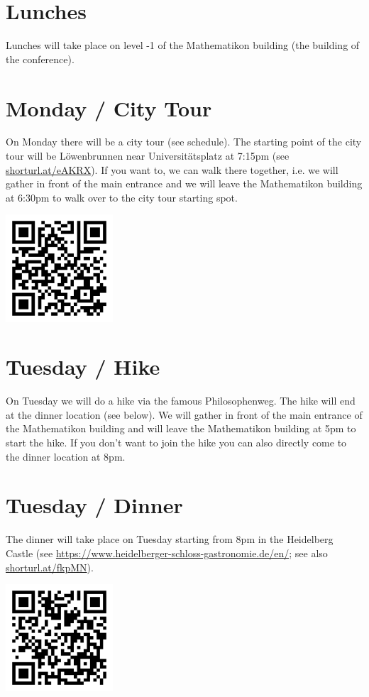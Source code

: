 \documentclass{article}
\begin{document}
\section{Lunches}
Lunches will take place on level -1 of the Mathematikon building (the building of the conference). 

\section{Monday / City Tour}
On Monday there will be a city tour (see schedule). The starting point of the city tour will be Löwenbrunnen near Universitätsplatz at 7:15pm (see \url{shorturl.at/eAKRX}). If you want to, we can walk there together, i.e. we will gather in front of the main entrance and we will leave the Mathematikon building at 6:30pm to walk over to the city tour starting spot. 
\begin{center}
        \includegraphics[width=4cm]{qr-code_citytour.png}
\end{center}
\vfill\pagebreak
\section{Tuesday / Hike}

On Tuesday we will do a hike via the famous Philosophenweg. The hike will end at the dinner location (see below). We will gather in front of the main entrance of the Mathematikon building and will leave the Mathematikon building at 5pm to start the hike. If you don't want to join the hike you can also directly come to the dinner location at 8pm.
\section{Tuesday / Dinner}
The dinner will take place on Tuesday starting from 8pm in the Heidelberg Castle (see \url{https://www.heidelberger-schloss-gastronomie.de/en/}; see also \url{shorturl.at/fkpMN}).  
\begin{center}
        \includegraphics[width=4cm]{qr-code_schloss_location.png}
\end{center}
\end{document}
